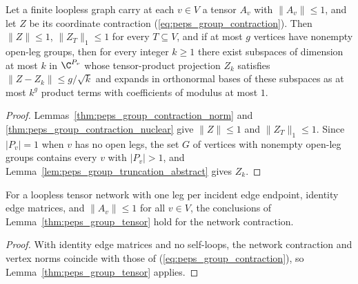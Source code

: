 \begin{lemma}
    \label{thm:peps_group_tensor}
    \leanok
    Let a finite loopless graph carry at each $v\in V$ a tensor $A_v$ with
    $\lVert A_v\rVert\le1$, and let $Z$ be its coordinate contraction
    (\ref{eq:peps_group_contraction}). Then $\lVert Z\rVert\le1$,
    $\lVert Z_T\rVert_1\le1$ for every $T\subseteq V$, and if at most $g$
    vertices have nonempty open-leg groups, then for every integer $k\ge1$
    there exist subspaces of dimension at most $k$ in $\C^{P_v}$ whose
    tensor-product projection $Z_k$ satisfies
    $\lVert Z-Z_k\rVert\le g/\sqrt{k}$ and expands in orthonormal bases of
    these subspaces as at most $k^g$ product terms with coefficients of
    modulus at most $1$.
\end{lemma}

\begin{proof}\leanok
    Lemmas~\ref{thm:peps_group_contraction_norm} and
    \ref{thm:peps_group_contraction_nuclear} give $\lVert Z\rVert\le1$ and
    $\lVert Z_T\rVert_1\le1$. Since $|P_v|=1$ when $v$ has no open legs, the
    set $G$ of vertices with nonempty open-leg groups contains every $v$ with
    $|P_v|>1$, and Lemma~\ref{lem:peps_group_truncation_abstract} gives $Z_k$.
\end{proof}

\begin{corollary}
    \label{cor:peps_group_tensor_network}
    \leanok
    For a loopless tensor network with one leg per incident edge endpoint,
    identity edge matrices, and $\lVert A_v\rVert\le1$ for all $v\in V$, the
    conclusions of Lemma~\ref{thm:peps_group_tensor} hold for the network
    contraction.
\end{corollary}

\begin{proof}\leanok
    With identity edge matrices and no self-loops, the network contraction and
    vertex norms coincide with those of (\ref{eq:peps_group_contraction}), so
    Lemma~\ref{thm:peps_group_tensor} applies.
\end{proof}
